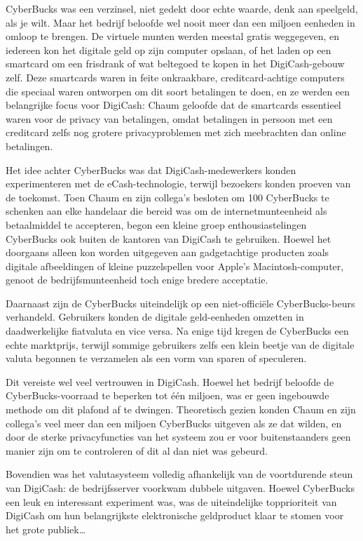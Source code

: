 \documentclass[
  a5paper,
  smalldemyvopaper,11pt,twoside,onecolumn,openright,extrafontsizes,
hidelinks]{memoir}
\begin{document}
CyberBucks was een verzinsel, niet gedekt door echte waarde, denk aan
speelgeld, als je wilt. Maar het bedrijf beloofde wel nooit meer dan een
miljoen eenheden in omloop te brengen. De virtuele munten werden meestal
gratis weggegeven, en iedereen kon het digitale geld op zijn computer
opslaan, of het laden op een smartcard om een frisdrank of wat beltegoed
te kopen in het DigiCash-gebouw zelf. Deze smartcards waren in feite
onkraakbare, creditcard-achtige computers die speciaal waren ontworpen
om dit soort betalingen te doen, en ze werden een belangrijke focus voor
DigiCash: Chaum geloofde dat de smartcards essentieel waren voor de
privacy van betalingen, omdat betalingen in persoon met een creditcard
zelfs nog grotere privacyproblemen met zich meebrachten dan online
betalingen.

Het idee achter CyberBucks was dat DigiCash-medewerkers konden
experimenteren met de eCash-technologie, terwijl bezoekers konden
proeven van de toekomst. Toen Chaum en zijn collega's besloten om 100
CyberBucks te schenken aan elke handelaar die bereid was om de
internetmunteenheid als betaalmiddel te accepteren, begon een kleine
groep enthousiastelingen CyberBucks ook buiten de kantoren van DigiCash
te gebruiken. Hoewel het doorgaans alleen kon worden uitgegeven aan
gadgetachtige producten zoals digitale afbeeldingen of kleine
puzzelspellen voor Apple's Macintosh-computer, genoot de
bedrijfsmunteenheid toch enige bredere acceptatie.

Daarnaast zijn de CyberBucks uiteindelijk op een niet-officiële
CyberBucks-beurs verhandeld. Gebruikers konden de digitale geld-eenheden
omzetten in daadwerkelijke fiatvaluta en vice versa. Na enige tijd
kregen de CyberBucks een echte marktprijs, terwijl sommige gebruikers
zelfs een klein beetje van de digitale valuta begonnen te verzamelen als
een vorm van sparen of speculeren.

Dit vereiste wel veel vertrouwen in DigiCash. Hoewel het bedrijf
beloofde de CyberBucks-voorraad te beperken tot één miljoen, was er geen
ingebouwde methode om dit plafond af te dwingen. Theoretisch gezien
konden Chaum en zijn collega's veel meer dan een miljoen CyberBucks
uitgeven als ze dat wilden, en door de sterke privacyfuncties van het
systeem zou er voor buitenstaanders geen manier zijn om te controleren
of dit al dan niet was gebeurd.

Bovendien was het valutasysteem volledig afhankelijk van de voortdurende
steun van DigiCash: de bedrijfsserver voorkwam dubbele uitgaven. Hoewel
CyberBucks een leuk en interessant experiment was, was de uiteindelijke
topprioriteit van DigiCash om hun belangrijkste elektronische
geldproduct klaar te stomen voor het grote publiek\ldots{}
\end{document}
